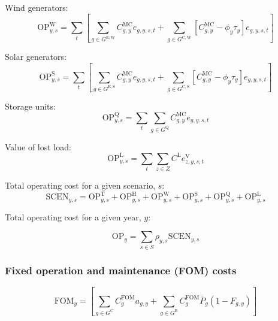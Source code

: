 \documentclass{article}
\newcommand{\sGeneratorsExisting}{G^{\mathrm{E}}}
\newcommand{\sGeneratorsExistingWind}{G^{\mathrm{E,W}}}
\newcommand{\sGeneratorsExistingSolar}{G^{\mathrm{E,S}}}
\newcommand{\sGeneratorsCandidate}{G^{\mathrm{C}}}
\newcommand{\sGeneratorsCandidateWind}{G^{\mathrm{C,W}}}
\newcommand{\sGeneratorsCandidateSolar}{G^{\mathrm{C,S}}}
\newcommand{\sStorage}{G^{\mathrm{Q}}}
\newcommand{\sScenarios}{S}
\newcommand{\sZones}{Z}
\newcommand{\iGenerator}{g}
\newcommand{\iYear}{y}
\newcommand{\iScenario}{s}
\newcommand{\iInterval}{t}
\newcommand{\iZone}{z}
\newcommand{\cOperatingCost}[1][\iYear,\iScenario]{\mathrm{OP}_{#1}}
\newcommand{\cOperatingCostThermal}[1][\iYear,\iScenario]{\mathrm{OP}^{\mathrm{T}}_{#1}}
\newcommand{\cOperatingCostHydro}[1][\iYear,\iScenario]{\mathrm{OP}^{\mathrm{H}}_{#1}}
\newcommand{\cOperatingCostWind}[1][\iYear,\iScenario]{\mathrm{OP}^{\mathrm{W}}_{#1}}
\newcommand{\cOperatingCostSolar}[1][\iYear,\iScenario]{\mathrm{OP}^{\mathrm{S}}_{#1}}
\newcommand{\cOperatingCostStorage}[1][\iYear,\iScenario]{\mathrm{OP}^{\mathrm{Q}}_{#1}}
\newcommand{\cFixedOperationsMaintenanceCost}[1][\iYear]{\mathrm{FOM}_{#1}}
\newcommand{\cFixedOperationsMaintenanceCostGenerator}[1][\iGenerator]{C^{\mathrm{FOM}}_{#1}}
\newcommand{\cScenarioDuration}[1][\iYear,\iScenario]{\rho_{#1}}
\newcommand{\cMarginalCost}[1][\iGenerator,\iYear]{C^{\mathrm{MC}}_{#1}}
\newcommand{\cPowerOutputMax}[1][\iGenerator,\iYear]{\overline{P}_{#1}}
\newcommand{\cOperatingCostLostLoad}[1][\iYear,\iScenario]{\mathrm{OP}^{\mathrm{L}}_{#1}}
\newcommand{\cLostLoadCost}{C^{\mathrm{L}}}
\newcommand{\cOperatingCostScenario}[1][\iYear,\iScenario]{\mathrm{SCEN}_{#1}}
\newcommand{\cRetirementIndicator}[1][\iGenerator,\iYear]{F_{#1}}
\newcommand{\vBaseline}[1][\iYear]{\phi_{#1}}
\newcommand{\vPermitPrice}[1][\iYear]{\tau_{#1}}
\newcommand{\vEnergy}[1][\iGenerator,\iYear,\iScenario,\iInterval]{e_{#1}}
\newcommand{\vLostLoadEnergy}[1][\iZone,\iYear,\iScenario,\iInterval]{e^{\mathrm{V}}_{#1}}
\newcommand{\vInstalledCapacityTotal}[1][\iGenerator,\iYear]{a_{#1}}
\begin{document}
Wind generators:
\begin{equation}
	\cOperatingCostWind = \sum\limits_{\iInterval}\left[\sum\limits_{\iGenerator \in \sGeneratorsExistingWind} \cMarginalCost \vEnergy + \sum\limits_{\iGenerator \in \sGeneratorsCandidateWind} \left[\cMarginalCost - \vBaseline \vPermitPrice\right] \vEnergy\right]
\end{equation}

Solar generators:
\begin{equation}
	\cOperatingCostSolar = \sum\limits_{\iInterval}\left[\sum\limits_{\iGenerator \in \sGeneratorsExistingSolar} \cMarginalCost \vEnergy + \sum\limits_{\iGenerator \in \sGeneratorsCandidateSolar} \left[\cMarginalCost - \vBaseline\vPermitPrice\right] \vEnergy\right]
\end{equation}

Storage units:
\begin{equation}
	\cOperatingCostStorage = \sum\limits_{\iInterval}\sum\limits_{\iGenerator \in \sStorage} \cMarginalCost \vEnergy
\end{equation}

Value of lost load:
\begin{equation}
	\cOperatingCostLostLoad = \sum\limits_{\iInterval}\sum\limits_{\iZone \in \sZones} \cLostLoadCost \vLostLoadEnergy
\end{equation}

Total operating cost for a given scenario, $\iScenario$:
\begin{equation}
	\cOperatingCostScenario = \cOperatingCostThermal + \cOperatingCostHydro + \cOperatingCostWind + \cOperatingCostSolar + \cOperatingCostStorage + \cOperatingCostLostLoad
\end{equation}

Total operating cost for a given year, $\iYear$:

\begin{equation}
	\cOperatingCost[\iYear] = \sum\limits_{\iScenario \in \sScenarios} \cScenarioDuration \cOperatingCostScenario
\end{equation}

\subsubsection{Fixed operation and maintenance (FOM) costs}

\begin{equation}
	\cFixedOperationsMaintenanceCost = \left[\sum\limits_{\iGenerator \in \sGeneratorsCandidate} \cFixedOperationsMaintenanceCostGenerator \vInstalledCapacityTotal + \sum\limits_{\iGenerator \in \sGeneratorsExisting} \cFixedOperationsMaintenanceCostGenerator \cPowerOutputMax[\iGenerator] \left(1 - \cRetirementIndicator\right) \right]
\end{equation}
\end{document}
